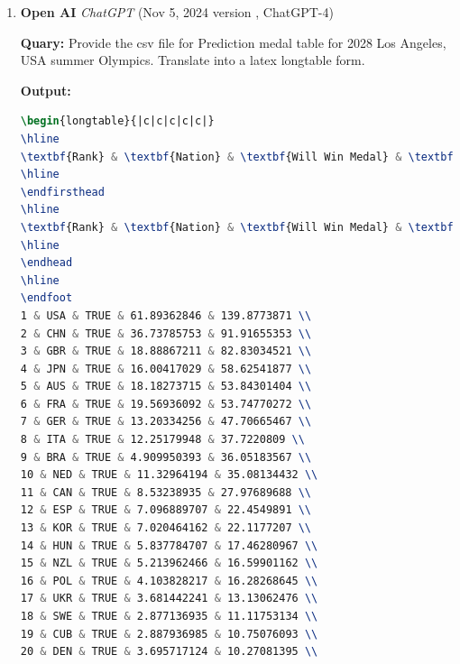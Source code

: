 \documentclass[12pt]{article}
\begin{document}
\begin{enumerate}
    \vspace{0.3cm}
    \item \textbf{Open AI}  \textit{ChatGPT} (Nov 5, 2024 version , ChatGPT-4)
    \par \textbf{Quary:} Provide the csv file for Prediction medal table for 2028 Los Angeles, USA summer Olympics. Translate into a latex longtable form.
    \par \textbf{Output:} 
    \begin{lstlisting}[language=Latex, style=mystyle]
\begin{longtable}{|c|c|c|c|c|}
\hline
\textbf{Rank} & \textbf{Nation} & \textbf{Will Win Medal} & \textbf{Gold} & \textbf{Total} \\
\hline
\endfirsthead
\hline
\textbf{Rank} & \textbf{Nation} & \textbf{Will Win Medal} & \textbf{Gold} & \textbf{Total} \\
\hline
\endhead
\hline
\endfoot
1 & USA & TRUE & 61.89362846 & 139.8773871 \\
2 & CHN & TRUE & 36.73785753 & 91.91655353 \\
3 & GBR & TRUE & 18.88867211 & 82.83034521 \\
4 & JPN & TRUE & 16.00417029 & 58.62541877 \\
5 & AUS & TRUE & 18.18273715 & 53.84301404 \\
6 & FRA & TRUE & 19.56936092 & 53.74770272 \\
7 & GER & TRUE & 13.20334256 & 47.70665467 \\
8 & ITA & TRUE & 12.25179948 & 37.7220809 \\
9 & BRA & TRUE & 4.909950393 & 36.05183567 \\
10 & NED & TRUE & 11.32964194 & 35.08134432 \\
11 & CAN & TRUE & 8.53238935 & 27.97689688 \\
12 & ESP & TRUE & 7.096889707 & 22.4549891 \\
13 & KOR & TRUE & 7.020464162 & 22.1177207 \\
14 & HUN & TRUE & 5.837784707 & 17.46280967 \\
15 & NZL & TRUE & 5.213962466 & 16.59901162 \\
16 & POL & TRUE & 4.103828217 & 16.28268645 \\
17 & UKR & TRUE & 3.681442241 & 13.13062476 \\
18 & SWE & TRUE & 2.877136935 & 11.11753134 \\
19 & CUB & TRUE & 2.887936985 & 10.75076093 \\
20 & DEN & TRUE & 3.695717124 & 10.27081395 \\

\end{lstlisting}
\end{enumerate}
\end{document}
